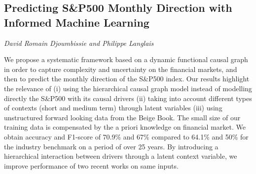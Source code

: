 \documentclass[../booklet.tex]{subfiles}
\begin{document}
\subsection[Predicting S\&P500 Monthly Direction with Informed Machine Learning. {\it David Romain Djoumbissie and Philippe Langlais}]{Predicting S\&P500 Monthly Direction with Informed Machine Learning}
 

\begin{center}
  {\it David Romain Djoumbissie and Philippe Langlais}
\end{center}



We propose a systematic framework based on a dynamic functional causal graph in order to capture complexity and uncertainty on the financial markets, and then to predict the monthly direction of the S\&P500 index. Our results highlight the relevance of (i) using the hierarchical causal graph model instead of modelling directly the S\&P500 with its causal drivers (ii) taking into account different types of contexts (short and medium term) through latent variables (iii) using unstructured forward looking data from the Beige Book. The small size of our training data is compensated by the a priori knowledge on financial market. We obtain accuracy and F1-score of 70.9\% and 67\% compared to 64.1\% and 50\% for the industry benchmark on a period of over 25 years. By introducing a hierarchical interaction between drivers through a latent context variable, we improve performance of two recent works on same inputs.\\ 

\end{document}
